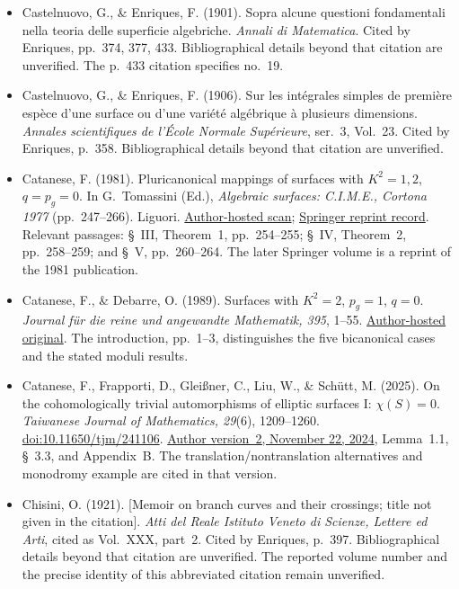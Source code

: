 \begin{sloppypar}
\begin{itemize}
\item Castelnuovo, G., \& Enriques, F. (1901). Sopra alcune questioni fondamentali nella teoria delle superficie algebriche. \emph{Annali di Matematica}. Cited by Enriques, pp.~374, 377, 433. Bibliographical details beyond that citation are unverified. The p.~433 citation specifies no.~19.

\item Castelnuovo, G., \& Enriques, F. (1906). Sur les intégrales simples de première espèce d'une surface ou d'une variété algébrique à plusieurs dimensions. \emph{Annales scientifiques de l'École Normale Supérieure}, ser.~3, Vol.~23. Cited by Enriques, p.~358. Bibliographical details beyond that citation are unverified.

\item Catanese, F. (1981). Pluricanonical mappings of surfaces with $K^2=1,2$, $q=p_g=0$. In G.~Tomassini (Ed.), \emph{Algebraic surfaces: C.I.M.E., Cortona 1977} (pp.~247--266). Liguori. \href{https://www.mathe8.uni-bayreuth.de/de/team/prof-fabrizio-catanese-old/pdf/006.pdf}{Author-hosted scan}; \href{https://link.springer.com/book/10.1007/978-3-642-11087-0}{Springer reprint record}. Relevant passages: \S~III, Theorem~1, pp.~254--255; \S~IV, Theorem~2, pp.~258--259; and \S~V, pp.~260--264. The later Springer volume is a reprint of the 1981 publication.

\item Catanese, F., \& Debarre, O. (1989). Surfaces with $K^2=2$, $p_g=1$, $q=0$. \emph{Journal für die reine und angewandte Mathematik, 395}, 1--55. \href{https://www.mathe8.uni-bayreuth.de/de/team/prof-fabrizio-catanese-old/pdf/032.pdf}{Author-hosted original}. The introduction, pp.~1--3, distinguishes the five bicanonical cases and the stated moduli results.

\item Catanese, F., Frapporti, D., Glei\ss ner, C., Liu, W., \& Schütt, M. (2025). On the cohomologically trivial automorphisms of elliptic surfaces I: $\chi(S)=0$. \emph{Taiwanese Journal of Mathematics, 29}(6), 1209--1260. \href{https://doi.org/10.11650/tjm/241106}{doi:10.11650/tjm/241106}. \href{https://arxiv.org/abs/2408.16936v2}{Author version~2, November 22, 2024}, Lemma~1.1, \S~3.3, and Appendix~B. The translation/nontranslation alternatives and monodromy example are cited in that version.

\item Chisini, O. (1921). [Memoir on branch curves and their crossings; title not given in the citation]. \emph{Atti del Reale Istituto Veneto di Scienze, Lettere ed Arti}, cited as Vol.~XXX, part~2. Cited by Enriques, p.~397. Bibliographical details beyond that citation are unverified. The reported volume number and the precise identity of this abbreviated citation remain unverified.


\end{itemize}
\end{sloppypar}
